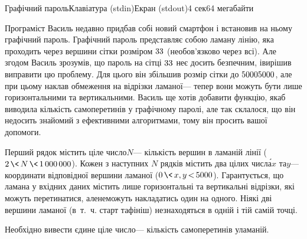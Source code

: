 \begin{problem}{Графічний пароль}{Клавіатура (stdin)}{Екран (stdout)}{4 сек}{64 мегабайти}


Програміст Василь недавно придбав собі новий смартфон і встановив на ньому графічний пароль. Графічний пароль представляє собою ламану лінію, яка проходить через вершини сітки розміром $3{\*}3$ (не\nolinebreak[3] обов'язково через всі). Але згодом Василь зрозумів, що пароль на сітці $3{\*}3$ не\nolinebreak[3] є досить безпечним, і\nolinebreak[3] вирішив виправити цю проблему. Для цього він збільшив розмір сітки до $5000{\*}5000$, але при цьому наклав обмеження на відрізки ламаної\nolinebreak[3] --- тепер вони можуть бути лише горизонтальними та вертикальними. Василь ще хотів добавити функцію, яка\nolinebreak[3] б виводила кількість самоперетинів у графічному паролі, але так склалося, що він не\nolinebreak[3] досить знайомий з ефективними алгоритмами, тому він просить вашої допомоги.

\InputFile
Перший рядок містить ціле число\nolinebreak[3] $N$\nolinebreak[3] --- кількість вершин в ламаній лінії ($2\dib{{\<}}N\dib{{\<}}{1\,000\,000}$). Кожен з наступних $N$ рядків містить два цілих числ\'{а}\nolinebreak[1] $x$ та\nolinebreak[3] $y$\nolinebreak[3] --- координати відповідної вершини ламаної ($0\dib{{\<}}{x, y}\dib{{<}}5000$). Гарантується, що ламана у вхідних даних містить лише горизонтальні та вертикальні відрізки, які можуть перетинатися, але\nolinebreak[1] не\nolinebreak[3] можуть накладатись один на одного. Ніякі дві вершини ламаної (в~т.~ч. старт та\nolinebreak[2] фініш) не\nolinebreak[3] знаходяться в одній і тій самій точці.

\OutputFile
Необхідно вивести єдине ціле число\nolinebreak[3] --- кількість самоперетинів у\nolinebreak[3] ламаній.

\vspace{-\baselineskip}

\Examples
\begin{exampleSimple}{5em}{3em}%
%
\end{exampleSimple} %
\begin{exampleSimple}{5em}{3em}%
%
\end{exampleSimple}

\end{problem}

